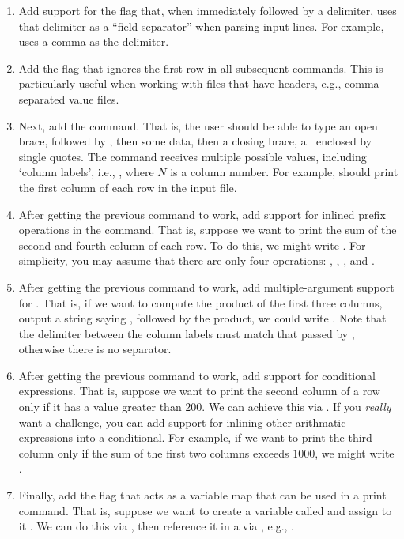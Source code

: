 \begin{enumerate}[label=(\alph*)]
    \item Add support for the  flag that, when immediately followed by a delimiter, uses that delimiter as a ``field separator'' when parsing input lines. For example,  uses a comma as the delimiter.
    \item Add the  flag that ignores the first row in all subsequent commands. This is particularly useful when working with files that have headers, e.g., comma-separated value files.
    \item Next, add the  command. That is, the user should be able to type an open brace, followed by , then some data, then a closing brace, all enclosed by single quotes. The  command receives multiple possible values, including `column labels', i.e., , where $N$ is a column number. For example,  should print the first column of each row in the input file. 
    \item After getting the previous command to work, add support for inlined prefix operations in the  command. That is, suppose we want to print the sum of the second and fourth column of each row. To do this, we might write . For simplicity, you may assume that there are only four operations: , , , and . 
    \item After getting the previous command to work, add multiple-argument support for . That is, if we want to compute the product of the first three columns, output a string saying , followed by the product, we could write . Note that the delimiter between the column labels must match that passed by , otherwise there is no separator.
    \item After getting the previous command to work, add support for conditional expressions. That is, suppose we want to print the second column of a row only if it has a value greater than $200$. We can achieve this via . If you \emph{really} want a challenge, you can add support for inlining other arithmatic expressions into a conditional. For example, if we want to print the third column only if the sum of the first two columns exceeds $1000$, we might write .
    \item Finally, add the  flag that acts as a variable map that can be used in a print command. That is, suppose we want to create a variable called  and assign to it . We can do this via , then reference it in a  via \ttt{\$}, e.g., .
\end{enumerate}

